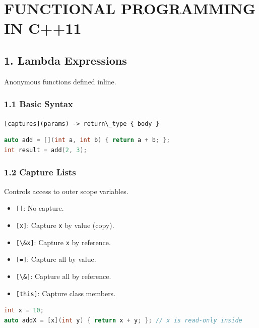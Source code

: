 \hypertarget{functional-programming-in-c11}{%
\chapter{FUNCTIONAL PROGRAMMING IN
C++11}\label{functional-programming-in-c11}}

\hypertarget{lambda-expressions}{%
\section{1. Lambda Expressions}\label{lambda-expressions}}

Anonymous functions defined inline.

\hypertarget{basic-syntax}{%
\subsection{1.1 Basic Syntax}\label{basic-syntax}}

\passthrough{\lstinline![captures](params) -> return\_type \{ body \}!}

\begin{lstlisting}[language={C++}]
auto add = [](int a, int b) { return a + b; };
int result = add(2, 3);
\end{lstlisting}

\hypertarget{capture-lists}{%
\subsection{1.2 Capture Lists}\label{capture-lists}}

Controls access to outer scope variables.

\begin{itemize}
\tightlist
\item
  \passthrough{\lstinline![]!}: No capture.
\item
  \passthrough{\lstinline![x]!}: Capture \passthrough{\lstinline!x!} by
  value (copy).
\item
  \passthrough{\lstinline![\&x]!}: Capture \passthrough{\lstinline!x!}
  by reference.
\item
  \passthrough{\lstinline![=]!}: Capture all by value.
\item
  \passthrough{\lstinline![\&]!}: Capture all by reference.
\item
  \passthrough{\lstinline![this]!}: Capture class members.
\end{itemize}

\begin{lstlisting}[language={C++}]
int x = 10;
auto addX = [x](int y) { return x + y; }; // x is read-only inside
\end{lstlisting}

